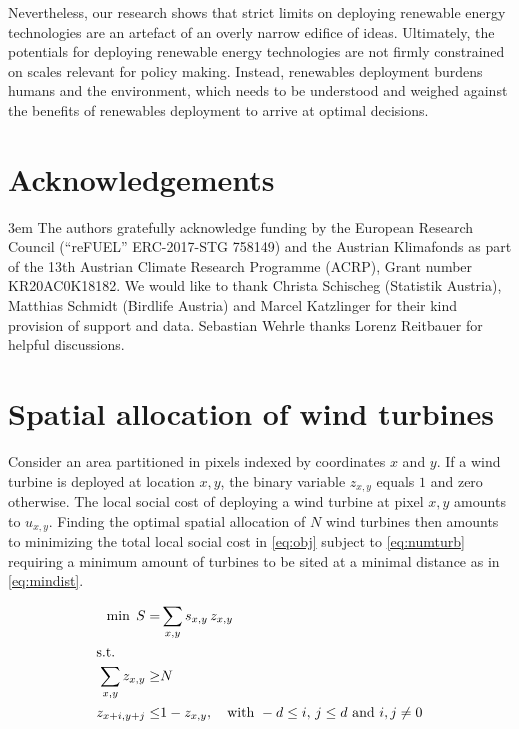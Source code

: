 \documentclass[review, a4paper, 12pt, authoryear, times]{elsarticle}
\begin{document}
Nevertheless, our research shows that strict limits on deploying renewable energy technologies are an artefact of an overly narrow edifice of ideas.
Ultimately, the potentials for deploying renewable energy technologies are not firmly constrained on scales relevant for policy making. 
Instead, renewables deployment burdens humans and the environment, which needs to be understood and weighed against the benefits of renewables deployment to arrive at optimal decisions.

\section*{Acknowledgements}
\emergencystretch 3em
The authors gratefully acknowledge funding by the European Research Council (“reFUEL” ERC-2017-STG 758149) and the Austrian Klimafonds as part of the 13th Austrian Climate Research Programme (ACRP), 
Grant number KR20AC0K18182.
We would like to thank Christa Schischeg (Statistik Austria), Matthias Schmidt (Birdlife Austria) and Marcel Katzlinger for their kind provision of support and data.
Sebastian Wehrle thanks Lorenz Reitbauer for helpful discussions.

\newpage



\newpage
\appendix
\section{Spatial allocation of wind turbines} \label{app:opt-loc-prob}
Consider an area partitioned in pixels indexed by coordinates $x$ and $y$. 
If a wind turbine is deployed at location $x,y$, the binary variable $z_{x,y}$ equals $1$ and zero otherwise.
The local social cost of deploying a wind turbine at pixel $x,y$ amounts to $u_{x,y}$.
Finding the optimal spatial allocation of $N$ wind turbines then amounts to minimizing the total local social cost in \eqref{eq:obj} subject to \eqref{eq:numturb} requiring a minimum amount of turbines to be sited at a minimal distance as in \eqref{eq:mindist}.

\begin{align}
    \min \; S =& \sum_{x, y} s_{x,y} \, z_{x,y} \label{eq:obj}\\
    \shortintertext{s.t.}
    \sum_{x,y} z_{x,y} \geq& N \label{eq:numturb}\\
    z_{x+i, y+j} \leq& 1-z_{x, y}, \quad \textrm{with } -d \leq i, \, j \leq d \textrm{ and } i,j\neq 0 \label{eq:mindist}
\end{align}
\end{document}

